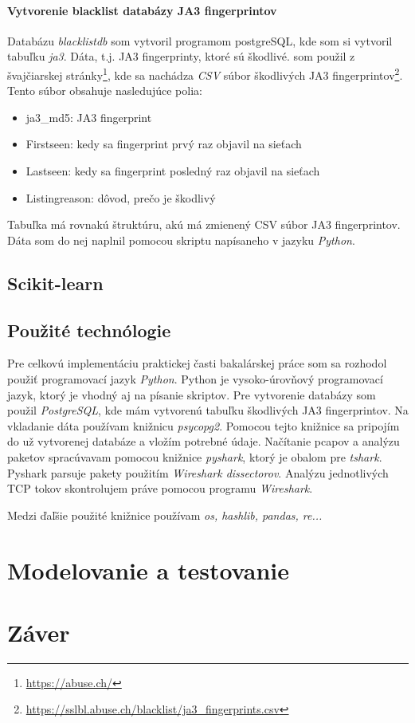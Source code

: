   
  \subsubsection{Vytvorenie blacklist databázy JA3 fingerprintov}
  Databázu \emph{blacklistdb} som vytvoril programom postgreSQL, kde som si vytvoril tabuľku \emph{ja3}. Dáta, t.j. JA3 fingerprinty, ktoré sú škodlivé. som použil z švajčiarskej stránky\footnote{\url{https://abuse.ch/}}, kde sa nachádza \emph{CSV} súbor škodlivých JA3 fingerprintov\footnote{\url{https://sslbl.abuse.ch/blacklist/ja3_fingerprints.csv}}. Tento súbor obsahuje nasledujúce polia:
  \begin{itemize}
      \item ja3\_md5: JA3 fingerprint
      \item Firstseen: kedy sa fingerprint prvý raz objavil na sieťach
      \item Lastseen: kedy sa fingerprint posledný raz objavil na sieťach
      \item Listingreason: dôvod, prečo je škodlivý 
  \end{itemize}
  Tabuľka má rovnakú štruktúru, akú má zmienený CSV súbor JA3 fingerprintov. Dáta som do nej naplnil pomocou skriptu napísaneho v jazyku \emph{Python}.
  
\section{Scikit-learn}

 
\section{Použité technólogie}
Pre celkovú implementáciu praktickej časti bakalárskej práce som sa rozhodol použiť programovací jazyk \emph{Python}. Python je vysoko-úrovňový programovací jazyk, ktorý je vhodný aj na písanie skriptov. Pre vytvorenie databázy som použil \emph{PostgreSQL}, kde mám vytvorenú tabuľku škodlivých JA3 fingerprintov. Na vkladanie dáta používam knižnicu \emph{psycopg2}. Pomocou tejto knižnice sa pripojím do už vytvorenej databáze a vložím potrebné údaje. Načítanie pcapov a analýzu paketov spracúvavam pomocou knižnice \emph{pyshark}, ktorý je obalom pre \emph{tshark}. Pyshark parsuje pakety použitím \emph{Wireshark dissectorov}. Analýzu jednotlivých TCP tokov skontrolujem práve pomocou programu \emph{Wireshark}. \par
Medzi ďaľšie použité knižnice používam \emph{os, hashlib, pandas, re...}

\chapter{Modelovanie a testovanie}
\chapter{Záver}

